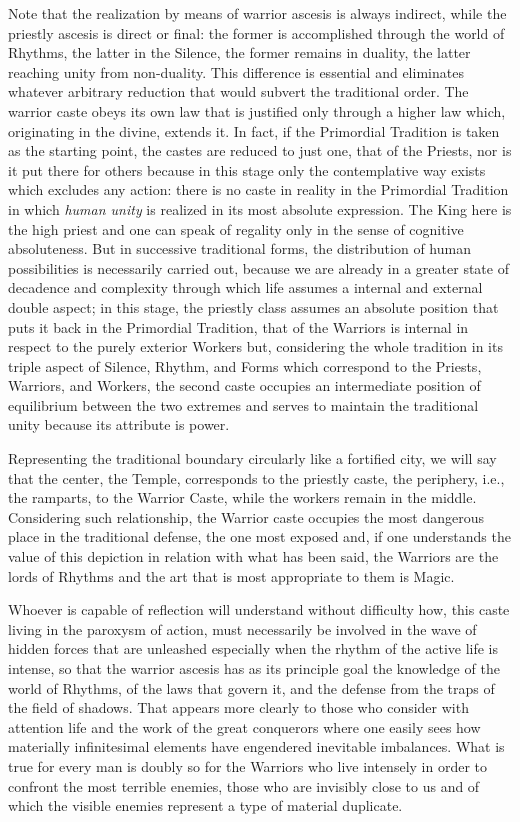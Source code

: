 Note that the realization by means of warrior ascesis is always indirect, while the priestly ascesis is direct or final: the former is accomplished through the world of Rhythms, the latter in the Silence, the former remains in duality, the latter reaching unity from non-duality. This difference is essential and eliminates whatever arbitrary reduction that would subvert the traditional order. The warrior caste obeys its own law that is justified only through a higher law which, originating in the divine, extends it. In fact, if the Primordial Tradition is taken as the starting point, the castes are reduced to just one, that of the Priests, nor is it put there for others because in this stage only the contemplative way exists which excludes any action: there is no caste in reality in the Primordial Tradition in which \emph{human unity} is realized in its most absolute expression. The King here is the high priest and one can speak of regality only in the sense of cognitive absoluteness. But in successive traditional forms, the distribution of human possibilities is necessarily carried out, because we are already in a greater state of decadence and complexity through which life assumes a internal and external double aspect; in this stage, the priestly class assumes an absolute position that puts it back in the Primordial Tradition, that of the Warriors is internal in respect to the purely exterior Workers but, considering the whole tradition in its triple aspect of Silence, Rhythm, and Forms which correspond to the Priests, Warriors, and Workers, the second caste occupies an intermediate position of equilibrium between the two extremes and serves to maintain the traditional unity because its attribute is power.

Representing the traditional boundary circularly like a fortified city, we will say that the center, the Temple, corresponds to the priestly caste, the periphery, i.e., the ramparts, to the Warrior Caste, while the workers remain in the middle. Considering such relationship, the Warrior caste occupies the most dangerous place in the traditional defense, the one most exposed and, if one understands the value of this depiction in relation with what has been said, the Warriors are the lords of Rhythms and the art that is most appropriate to them is Magic.

Whoever is capable of reflection will understand without difficulty how, this caste living in the paroxysm of action, must necessarily be involved in the wave of hidden forces that are unleashed especially when the rhythm of the active life is intense, so that the warrior ascesis has as its principle goal the knowledge of the world of Rhythms, of the laws that govern it, and the defense from the traps of the field of shadows. That appears more clearly to those who consider with attention life and the work of the great conquerors where one easily sees how materially infinitesimal elements have engendered inevitable imbalances. What is true for every man is doubly so for the Warriors who live intensely in order to confront the most terrible enemies, those who are invisibly close to us and of which the visible enemies represent a type of material duplicate.

